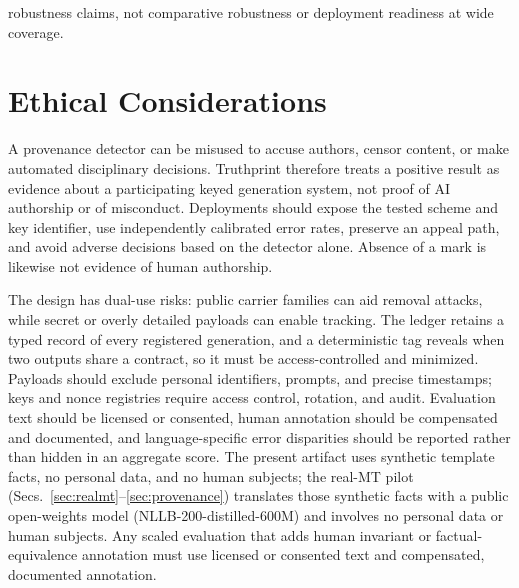 \documentclass[journal]{IEEEtran}
\begin{document}
robustness claims, not comparative robustness or deployment readiness at wide coverage.

\section*{Ethical Considerations}
A provenance detector can be misused to accuse authors, censor content, or make automated disciplinary decisions. Truthprint therefore treats a positive result as evidence about a participating keyed generation system, not proof of AI authorship or of misconduct. Deployments should expose the tested scheme and key identifier, use independently calibrated error rates, preserve an appeal path, and avoid adverse decisions based on the detector alone. Absence of a mark is likewise not evidence of human authorship.

The design has dual-use risks: public carrier families can aid removal attacks, while secret or overly detailed payloads can enable tracking. The ledger retains a typed record of every registered generation, and a deterministic tag reveals when two outputs share a contract, so it must be access-controlled and minimized. Payloads should exclude personal identifiers, prompts, and precise timestamps; keys and nonce registries require access control, rotation, and audit. Evaluation text should be licensed or consented, human annotation should be compensated and documented, and language-specific error disparities should be reported rather than hidden in an aggregate score. The present artifact uses synthetic template facts, no personal data, and no human subjects; the real-MT pilot (Secs.~\ref{sec:realmt}--\ref{sec:provenance}) translates those synthetic facts with a public open-weights model (NLLB-200-distilled-600M) and involves no personal data or human subjects. Any scaled evaluation that adds human invariant or factual-equivalence annotation must use licensed or consented text and compensated, documented annotation.
\end{document}
